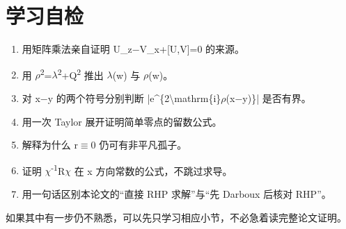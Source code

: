 \section{学习自检}

\begin{enumerate}[leftmargin=2em]
\item 用矩阵乘法亲自证明 U\_z\ensuremath{-}V\_x+[U,V]=0 的来源。
\item 用 \ensuremath{\rho}\textsuperscript{2}=\ensuremath{\lambda}\textsuperscript{2}+Q\textsuperscript{2} 推出 \ensuremath{\lambda}(w) 与 \ensuremath{\rho}(w)。
\item 对 x\ensuremath{-}y 的两个符号分别判断 |e\textasciicircum{}\{2\textbackslash{}mathrm\{i\}\ensuremath{\rho}(x\ensuremath{-}y)\}| 是否有界。
\item 用一次 Taylor 展开证明简单零点的留数公式。
\item 解释为什么 r\ensuremath{\equiv}0 仍可有非平凡孤子。
\item 证明 \ensuremath{\chi}\textsuperscript{-}\textsuperscript{1}R\ensuremath{\chi} 在 x 方向常数的公式，不跳过求导。
\item 用一句话区别本论文的“直接 RHP 求解”与“先 Darboux 后核对 RHP”。
\end{enumerate}

如果其中有一步仍不熟悉，可以先只学习相应小节，不必急着读完整论文证明。\par

